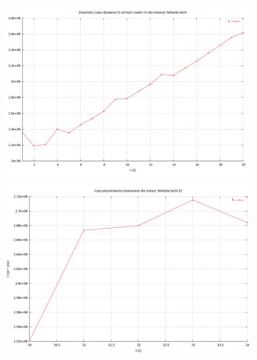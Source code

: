 \documentclass[a4paper,11pt]{article}
\begin{document}
\pagebreak

\begin{figure}[!h]
\begin{center}
\includegraphics[scale=0.39]{images/wyk1.png} \\
\end {center}
\end{figure}

\pagebreak

\begin{figure}[!h]
\begin{center}
\includegraphics[scale=0.39]{images/wyk2.png} \\
\end {center}
\end{figure}
\end{document}
